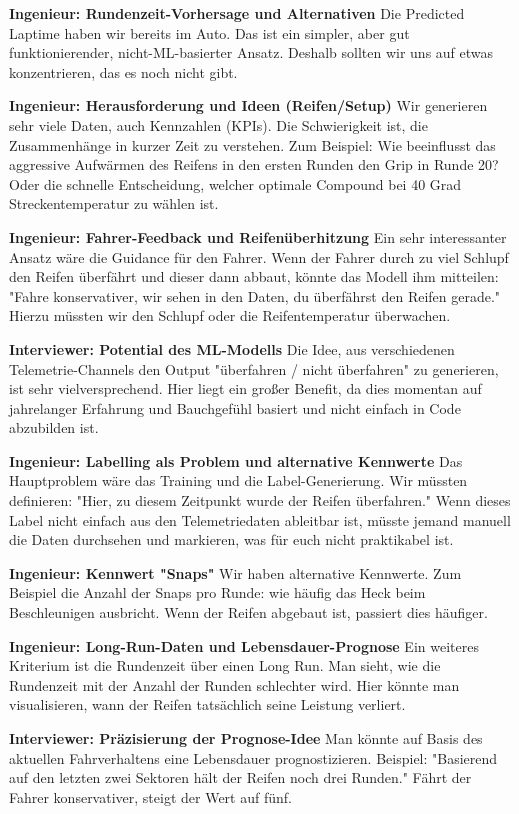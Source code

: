 \textbf{Ingenieur: Rundenzeit-Vorhersage und Alternativen}
Die Predicted Laptime haben wir bereits im Auto. Das ist ein simpler, aber gut funktionierender, nicht-ML-basierter Ansatz. Deshalb sollten wir uns auf etwas konzentrieren, das es noch nicht gibt.

\textbf{Ingenieur: Herausforderung und Ideen (Reifen/Setup)}
Wir generieren sehr viele Daten, auch Kennzahlen (KPIs). Die Schwierigkeit ist, die Zusammenhänge in kurzer Zeit zu verstehen. Zum Beispiel: Wie beeinflusst das aggressive Aufwärmen des Reifens in den ersten Runden den Grip in Runde 20? Oder die schnelle Entscheidung, welcher optimale Compound bei 40 Grad Streckentemperatur zu wählen ist.

\textbf{Ingenieur: Fahrer-Feedback und Reifenüberhitzung}
Ein sehr interessanter Ansatz wäre die Guidance für den Fahrer. Wenn der Fahrer durch zu viel Schlupf den Reifen überfährt und dieser dann abbaut, könnte das Modell ihm mitteilen: "Fahre konservativer, wir sehen in den Daten, du überfährst den Reifen gerade." Hierzu müssten wir den Schlupf oder die Reifentemperatur überwachen.

\textbf{Interviewer: Potential des ML-Modells}
Die Idee, aus verschiedenen Telemetrie-Channels den Output "überfahren / nicht überfahren" zu generieren, ist sehr vielversprechend. Hier liegt ein großer Benefit, da dies momentan auf jahrelanger Erfahrung und Bauchgefühl basiert und nicht einfach in Code abzubilden ist.

\textbf{Ingenieur: Labelling als Problem und alternative Kennwerte}
Das Hauptproblem wäre das Training und die Label-Generierung. Wir müssten definieren: "Hier, zu diesem Zeitpunkt wurde der Reifen überfahren." Wenn dieses Label nicht einfach aus den Telemetriedaten ableitbar ist, müsste jemand manuell die Daten durchsehen und markieren, was für euch nicht praktikabel ist.

\textbf{Ingenieur: Kennwert "Snaps"}
Wir haben alternative Kennwerte. Zum Beispiel die Anzahl der Snaps pro Runde: wie häufig das Heck beim Beschleunigen ausbricht. Wenn der Reifen abgebaut ist, passiert dies häufiger.

\textbf{Ingenieur: Long-Run-Daten und Lebensdauer-Prognose}
Ein weiteres Kriterium ist die Rundenzeit über einen Long Run. Man sieht, wie die Rundenzeit mit der Anzahl der Runden schlechter wird. Hier könnte man visualisieren, wann der Reifen tatsächlich seine Leistung verliert.

\textbf{Interviewer: Präzisierung der Prognose-Idee}
Man könnte auf Basis des aktuellen Fahrverhaltens eine Lebensdauer prognostizieren. Beispiel: "Basierend auf den letzten zwei Sektoren hält der Reifen noch drei Runden." Fährt der Fahrer konservativer, steigt der Wert auf fünf.

